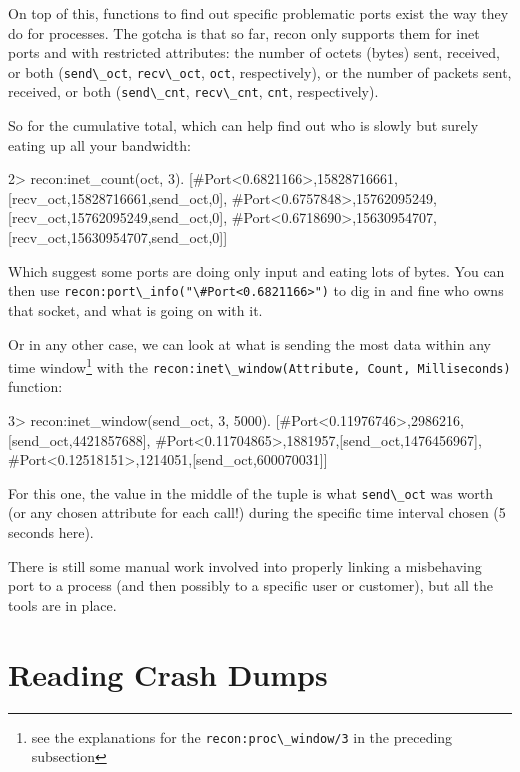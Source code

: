 \documentclass[11pt, oneside]{book}   	%
\newcommand{\function}[1]{\Verb`#1`}
\newcommand{\expression}[1]{\Verb`#1`}
\begin{document}
On top of this, functions to find out specific problematic ports exist the way they do for processes. The gotcha is that so far, recon only supports them for inet ports and with restricted attributes: the number of octets (bytes) sent, received, or both (\expression{send\_oct}, \expression{recv\_oct}, \expression{oct}, respectively), or the number of packets sent, received, or both (\expression{send\_cnt}, \expression{recv\_cnt}, \expression{cnt}, respectively).

So for the cumulative total, which can help find out who is slowly but surely eating up all your bandwidth:

\begin{VerbatimEshell}
2> recon:inet_count(oct, 3).
[{#Port<0.6821166>,15828716661,
  [{recv_oct,15828716661},{send_oct,0}]},
 {#Port<0.6757848>,15762095249,
  [{recv_oct,15762095249},{send_oct,0}]},
 {#Port<0.6718690>,15630954707,
  [{recv_oct,15630954707},{send_oct,0}]}]
\end{VerbatimEshell}

Which suggest some ports are doing only input and eating lots of bytes. You can then use \function{recon:port\_info("\#Port<0.6821166>")} to dig in and fine who owns that socket, and what is going on with it.

Or in any other case, we can look at what is sending the most data within any time window\footnote{see the explanations for the \function{recon:proc\_window/3} in the preceding subsection} with the \function{recon:inet\_window(Attribute, Count, Milliseconds)} function:

\begin{VerbatimEshell}
3> recon:inet_window(send_oct, 3, 5000).
[{#Port<0.11976746>,2986216,[{send_oct,4421857688}]},
 {#Port<0.11704865>,1881957,[{send_oct,1476456967}]},
 {#Port<0.12518151>,1214051,[{send_oct,600070031}]}]
\end{VerbatimEshell}

For this one, the value in the middle of the tuple is what \expression{send\_oct} was worth (or any chosen attribute for each call!) during the specific time interval chosen (5 seconds here).

There is still some manual work involved into properly linking a misbehaving port to a process (and then possibly to a specific user or customer), but all the tools are in place. 


\chapter{Reading Crash Dumps}
\label{chap:crash-dumps}
\end{document}
